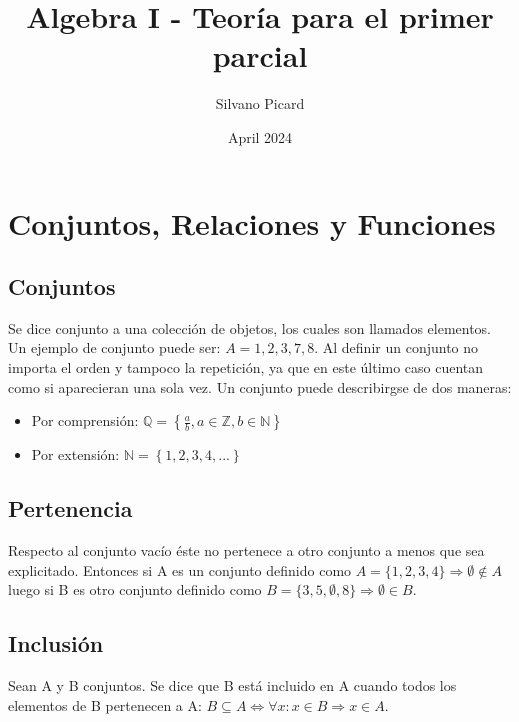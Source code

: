 \documentclass{article}
\title{Algebra I - Teoría para el primer parcial}
\author{Silvano Picard}
\date{April 2024}
\begin{document}
\maketitle

\section{Conjuntos, Relaciones y Funciones}
\subsection{Conjuntos}

Se dice conjunto a una colección de objetos, los cuales son llamados elementos. Un ejemplo de conjunto puede ser: \begin{math}
    A = {1,2,3,7,8}
\end{math}. Al definir un conjunto no importa el orden y tampoco la repetición, ya que en este último caso cuentan como si aparecieran una sola vez.
    Un conjunto puede describirgse de dos maneras: 
    \begin{itemize}
        \item Por comprensión: \begin{math}
            \mathbb{Q} = \left\{\frac{a}{b}, a \in \mathbb{Z}, b \in \mathbb{N}\right\}
        \end{math}
        \item Por extensión: \begin{math}
            \mathbb{N} = \left\{1,2,3,4,...\right\}
        \end{math}
    \end{itemize}
\subsection{Pertenencia}
Respecto al conjunto vacío éste no pertenece a otro conjunto a menos que sea explicitado. Entonces si A es un conjunto definido como \begin{math}
    A = \{1,2,3,4\} \Rightarrow \emptyset \notin A
\end{math} luego si B es otro conjunto definido como \begin{math}
    B = \{3,5,\emptyset,8\} \Rightarrow \emptyset \in B.
\end{math}
\subsection{Inclusión}
Sean A y B conjuntos. Se dice que B está incluido en A cuando todos los elementos de B pertenecen a A: \begin{math}
    B \subseteq A \iff \forall x: x \in B \Rightarrow x \in A
\end{math}.
\end{document}
